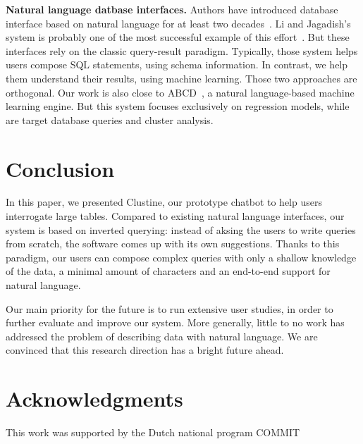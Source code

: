 \textbf{Natural language datbase interfaces.} Authors have introduced database
interface based on natural language for at least two
decades~\cite{androutsopoulos1995natural}. Li and Jagadish's system is
probably one of the most successful example of this
effort~\cite{li2014constructing}. But these interfaces rely on the classic
query-result paradigm.  Typically, those system helps users compose SQL
statements, using schema information. In contrast, we help them understand
their results, using machine learning. Those two approaches are orthogonal. Our
work is also close to ABCD~\cite{Lloyd2014ABCD}, a natural language-based
machine learning engine. But this system focuses exclusively on regression
models, while are target database queries and cluster analysis.


\section{Conclusion}
\label{sec:conclusion} 
In this paper, we presented Clustine, our prototype chatbot to help users
interrogate large tables.  Compared to existing natural language interfaces,
our system is based on inverted querying: instead of aksing the users to write
queries from scratch, the software comes up with its own suggestions. Thanks to
this paradigm, our users can compose complex queries with only a shallow
knowledge of the data, a minimal amount of characters and an end-to-end support
for natural language. 

Our main priority for the future is to run extensive user studies, in order to
further evaluate and improve our system. More generally, little to no work has
addressed the problem of describing data with natural language. We are
convinced that this research direction has a bright future ahead.

\section{Acknowledgments}
\label{sec:ack} 
This work was supported by the Dutch national program
COMMIT

